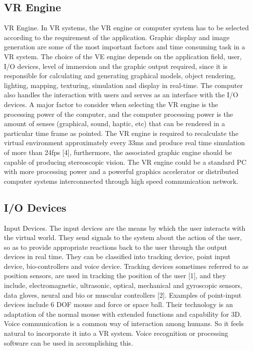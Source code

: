 \subsection{VR Engine}
VR Engine. In VR systems, the VR engine or computer system has to be selected according to the
requirement of the application. Graphic display and image generation are some of the most important factors and time consuming task in a VR system. The choice of the VE engine depends on the application field, user, I/O devices, level of immersion and the graphic output required, since it is responsible for calculating and generating graphical models, object rendering, lighting, mapping, texturing, simulation and display in real-time. The computer also handles the interaction with users and serves as an interface with the I/O devices. A major factor to consider when selecting the VR engine is the processing power of the computer, and the computer processing power is the amount of senses (graphical, sound, haptic, etc) that can be rendered in a particular time frame as pointed. The VR engine is required to recalculate the virtual environment approximately every 33ms and produce real time simulation of more than 24fps [4], furthermore, the associated graphic engine should be capable of producing stereoscopic vision. The VR engine could be a standard PC with more processing power and a powerful graphics accelerator or distributed computer systems interconnected through high speed communication network.


\subsection{I/O Devices}
Input Devices. The input devices are the means by which the user interacts with the virtual world. They send signals to the system about the action of the user, so as to provide appropriate reactions back to the user through the output devices in real time. They can be classified into tracking device, point input device, bio-controllers and voice device. Tracking devices sometimes referred to as position sensors, are used in tracking the position of the user [1], and they include, electromagnetic, ultrasonic, optical, mechanical and gyroscopic sensors, data gloves, neural and bio or muscular controllers [2]. Examples of point-input devices include 6 DOF mouse and force or space ball. Their technology is an adaptation of the normal mouse with extended functions and capability for 3D. Voice communication is a common way of interaction among humans. So it feels natural to incorporate it into a VR system. Voice recognition or processing software can be used in accomplishing this.

